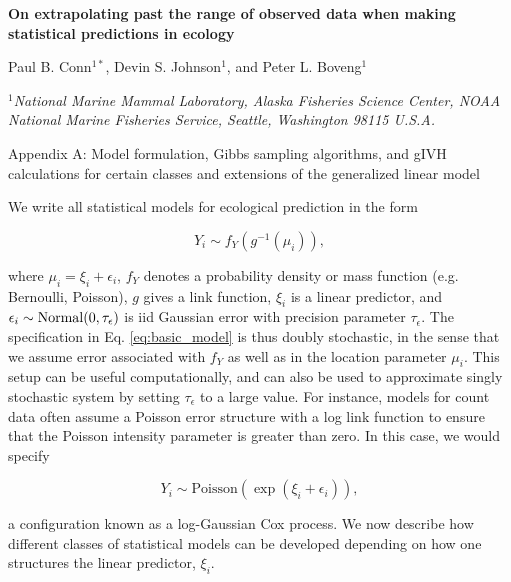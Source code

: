 \documentclass[12pt,fleqn]{article}
\begin{document}
\begin{center} \bf {\large On extrapolating past the range of observed data when making statistical predictions in ecology}

\vspace{0.7cm}
Paul B. Conn$^{1*}$, Devin S. Johnson$^1$, and Peter L. Boveng$^1$
\end{center}
\vspace{0.5cm}

\rm
\small

\it $^1$National Marine Mammal Laboratory, Alaska Fisheries Science Center,
NOAA National Marine Fisheries Service,
Seattle, Washington 98115 U.S.A.\\

\rm \begin{flushleft}

\raggedbottom
\vspace{.5in}

\begin{center}
Appendix A: Model formulation, Gibbs sampling algorithms, and gIVH calculations for certain classes and extensions of the generalized linear model
\bigskip
\end{center}
\vspace{.3in}

\doublespacing



We write all statistical models for ecological prediction in the form
\begin{linenomath*}
\begin{equation}
  \label{eq:basic_model}
  Y_i \sim f_Y(g^{-1}(\mu_i)),
\end{equation}
\end{linenomath*}
where $\mu_i=\xi_i + \epsilon_i$, $f_Y$ denotes a probability density or mass function (e.g. Bernoulli, Poisson), $g$ gives a link function,
$\xi_i$ is a linear predictor, and $\epsilon_i \sim {\rm Normal}(0,\tau_\epsilon)$ is iid Gaussian error with precision parameter $\tau_\epsilon$.  The specification in Eq. \ref{eq:basic_model} is thus doubly stochastic, in the sense that we assume error associated with $f_Y$ as well as in the location parameter $\mu_i$.  This setup can be useful computationally, and can also be used to approximate singly stochastic system by setting $\tau_\epsilon$ to a large value.  For instance, models for count data often assume a Poisson error structure with a log link function to ensure that the Poisson intensity parameter is greater than zero.  In this case, we would specify
\begin{linenomath*}
\begin{equation*}
  Y_i \sim \mathrm{Poisson}(\exp(\xi_i + \epsilon_i)),
\end{equation*}
\end{linenomath*}
a configuration known as a log-Gaussian Cox process.
We now describe how different classes of statistical models can be developed depending on how one structures the linear predictor, $\xi_i$.


\end{flushleft}
\end{document}
